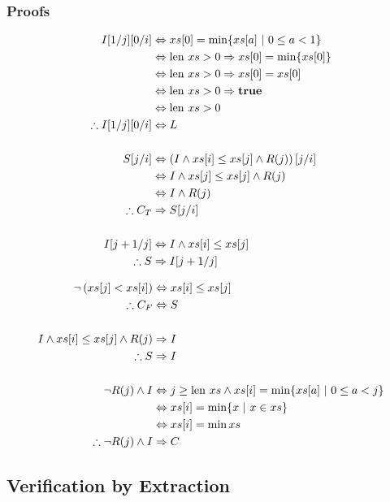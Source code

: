 \begin{lscape}
\begin{multicols}{3}
\subsubsection{Proofs}
\begin{align*}
  I[1/j][0/i] &\iff xs[0] = \min \{xs[a]~|~0 \leq a < 1\}\\
  &\iff \len xs > 0 \implies xs[0] = \min \{xs[0]\}\\
  &\iff \len xs > 0 \implies xs[0] = xs[0]\\
  &\iff \len xs > 0 \implies \true\\
  &\iff \len xs > 0\\
  \therefore I[1/j][0/i] &\iff L\\\\
%
  S[j/i] &\iff \left(I \land xs[i] \leq xs[j] \land R(j)\right)[j/i]\\
  &\iff I \land xs[j] \leq xs[j] \land R(j)\\
  &\iff I \land R(j)\\
  \therefore C_{T} &\implies S[j/i]\\\\
%
  I[j+1/j] &\iff I \land xs[i] \leq xs[j]\\
  \therefore S &\implies I[j+1/j]
\end{align*}

\begin{align*}
  \lnot\left(xs[j] < xs[i]\right) &\iff xs[i] \leq xs[j]\\
  \therefore C_{F} &\iff S\\\\
%
  I \land xs[i] \leq xs[j] \land R(j) &\implies I\\
  \therefore S &\implies I\\\\
%
  \lnot R(j) \land I &\iff j \geq \len xs \land xs[i] = \min
  \{xs[a]~|~0 \leq a < j\}\\
  &\iff xs[i] = \min \{x~|~x \in xs\}\\
  &\iff xs[i] = \min xs\\
  \therefore \lnot R(j) \land I &\implies C
\end{align*}
\vfill
\end{multicols}

\end{lscape}

\subsection{Verification by Extraction}
\label{sec:lit-verification-extraction}

